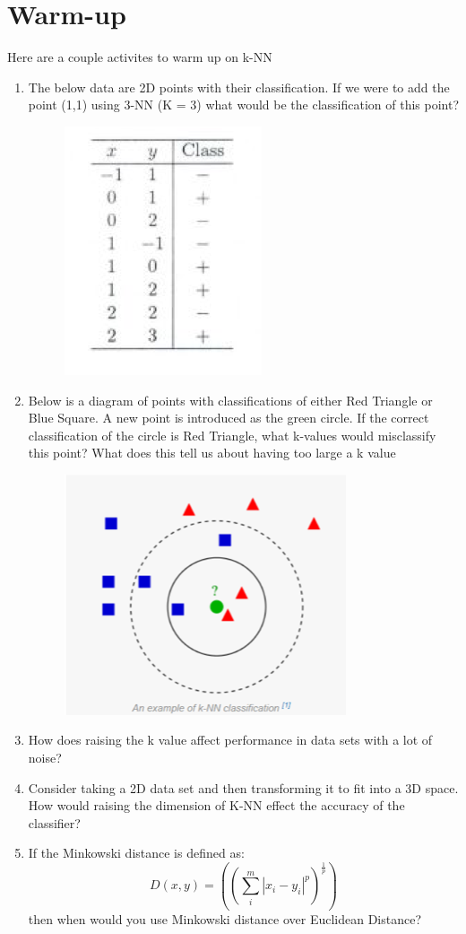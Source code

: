 \documentclass{report}
\begin{document}
\section*{Warm-up}
Here are a couple activites to warm up on k-NN 
\begin{enumerate}
	\item The below data are 2D points with their classification. If we were to add the point (1,1) using 3-NN (K = 3) what would be the classification of this point?
	\begin{figure}[H]
		\centering
		\includegraphics{image/Picture1.png}
	\end{figure}
	\item Below is a diagram of points with classifications of either Red Triangle or Blue Square. A new point is introduced as the green circle. If the correct classification of the circle is Red Triangle, what k-values would misclassify this point? What does this tell us about having too large a k value
	\begin{figure}[H]
		\centering
		\includegraphics{image/Picture2.png}
	\end{figure}
	\item How does raising the k value affect performance in data sets with a lot of noise? 
	\item Consider taking a 2D data set and then transforming it to fit into a 3D space. How would raising the dimension of K-NN effect the accuracy of the classifier?
	\item If the Minkowski distance is defined as: 
	\begin{equation}
	D (x, y) = ((\sum_{i}^{m}| x_{i} - y_{i}|^p)^\frac{1}{p})
	\end{equation}
     then when would you use Minkowski distance over Euclidean Distance?
	


\end{enumerate}
\end{document}
